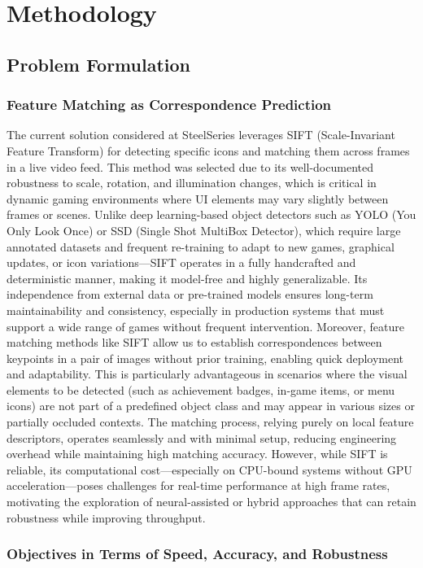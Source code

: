 \chapter{Methodology}
\section{Problem Formulation}
\subsection{Feature Matching as Correspondence Prediction}
The current solution considered at SteelSeries leverages SIFT (Scale-Invariant
Feature Transform) for detecting specific icons and matching them across frames
in a live video feed. This method was selected due to its well-documented
robustness to scale, rotation, and illumination changes, which is critical in
dynamic gaming environments where UI elements may vary slightly between frames
or scenes. Unlike deep learning-based object detectors such as YOLO (You Only
Look Once) or SSD (Single Shot MultiBox Detector), which require large
annotated datasets and frequent re-training to adapt to new games, graphical
updates, or icon variations—SIFT operates in a fully handcrafted and
deterministic manner, making it model-free and highly generalizable. Its
independence from external data or pre-trained models ensures long-term
maintainability and consistency, especially in production systems that must
support a wide range of games without frequent intervention. Moreover, feature
matching methods like SIFT allow us to establish correspondences between
keypoints in a pair of images without prior training, enabling quick deployment
and adaptability. This is particularly advantageous in scenarios where the
visual elements to be detected (such as achievement badges, in-game items, or
menu icons) are not part of a predefined object class and may appear in various
sizes or partially occluded contexts. The matching process, relying purely on
local feature descriptors, operates seamlessly and with minimal setup, reducing
engineering overhead while maintaining high matching accuracy. However, while
SIFT is reliable, its computational cost—especially on CPU-bound systems
without GPU acceleration—poses challenges for real-time performance at high
frame rates, motivating the exploration of neural-assisted or hybrid approaches
that can retain robustness while improving throughput.
\subsection{Objectives in Terms of Speed, Accuracy, and Robustness}

